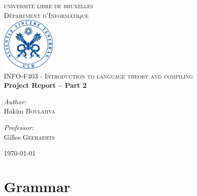 \documentclass[letterpaper]{article}
\begin{document}
\begin{titlepage}
\begin{center}


\textsc{\LARGE universit\'e libre de bruxelles}\\[1.0cm]
\textsc{\Large D\'epartment d'Informatique}\\[1.5cm]

\includegraphics[width=0.2\textwidth]{image/ulblogo.jpg}~\\[1cm]

\textsc{\Large INFO-F403 - Introduction to language theory and compiling
\\[0.3cm]}
{ \huge \bfseries Project Report – Part 2  \\[0.4cm] }


\noindent
\begin{center} \large

\emph{Author:}\\
Hakim \textsc{Boulahya}\\
\end{center}
\begin{center} \large

\emph{Professor:} \\
Gilles \textsc{Geeraerts}\\

\end{center}

\vfill

{\large \today}

\end{center}
\end{titlepage}

\tableofcontents
\newpage

\section{Grammar}
\end{document}
